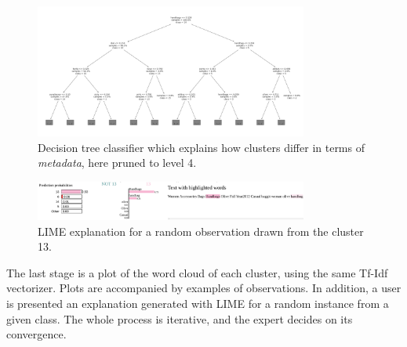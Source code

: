 \documentclass{article}
\begin{document}
\begin{figure}[h!]
    \centering
    \includegraphics[width=0.8\textwidth]{tree-improved}
    \caption{Decision tree classifier which explains how clusters differ in terms of \textit{metadata}, here pruned to level 4.}
    \label{fig:decision_tree}
\end{figure}

\begin{figure}[h!]
    \centering
    \includegraphics[width=0.8\textwidth]{example1-clustering-products-fashion-tex/LIME_13_handbags-Selection_265}
    \caption{LIME explanation for a random observation drawn from the cluster 13.}
    \label{fig:lime}
\end{figure}

The last stage is a plot of the word cloud of each cluster, using the same Tf-Idf vectorizer.
Plots are accompanied by examples of observations.%
In addition, a user is presented an explanation generated with LIME for a random instance from a given class.
The whole process is iterative, and the expert decides on its convergence.

%
\end{document}
